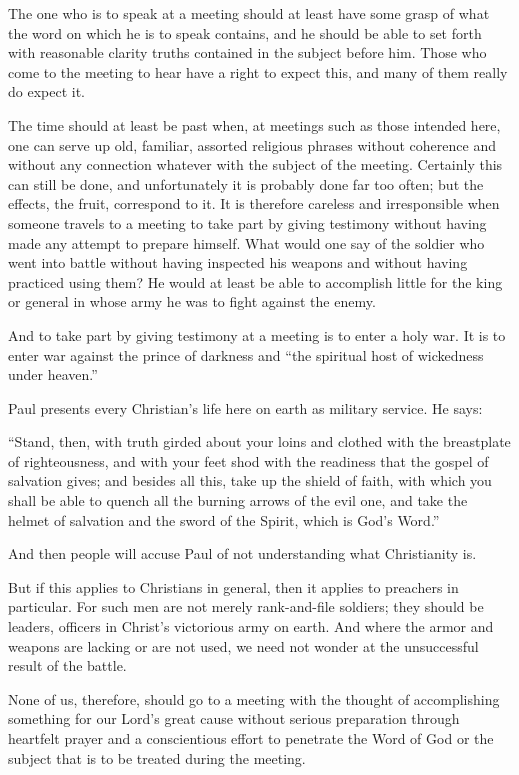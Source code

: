 The one who is to speak at a meeting should at least have some grasp of what the word on which he is to speak contains, and he should be able to set forth with reasonable clarity truths contained in the subject before him. Those who come to the meeting to hear have a right to expect this, and many of them really do expect it.

The time should at least be past when, at meetings such as those intended here, one can serve up old, familiar, assorted religious phrases without coherence and without any connection whatever with the subject of the meeting. Certainly this can still be done, and unfortunately it is probably done far too often; but the effects, the fruit, correspond to it. It is therefore careless and irresponsible when someone travels to a meeting to take part by giving testimony without having made any attempt to prepare himself. What would one say of the soldier who went into battle without having inspected his weapons and without having practiced using them? He would at least be able to accomplish little for the king or general in whose army he was to fight against the enemy.

And to take part by giving testimony at a meeting is to enter a holy war. It is to enter war against the prince of darkness and “the spiritual host of wickedness under heaven.”

Paul presents every Christian’s life here on earth as military service. He says:

“Stand, then, with truth girded about your loins and clothed with the breastplate of righteousness, and with your feet shod with the readiness that the gospel of salvation gives; and besides all this, take up the shield of faith, with which you shall be able to quench all the burning arrows of the evil one, and take the helmet of salvation and the sword of the Spirit, which is God’s Word.”

And then people will accuse Paul of not understanding what Christianity is.

But if this applies to Christians in general, then it applies to preachers in particular. For such men are not merely rank-and-file soldiers; they should be leaders, officers in Christ’s victorious army on earth. And where the armor and weapons are lacking or are not used, we need not wonder at the unsuccessful result of the battle.

None of us, therefore, should go to a meeting with the thought of accomplishing something for our Lord’s great cause without serious preparation through heartfelt prayer and a conscientious effort to penetrate the Word of God or the subject that is to be treated during the meeting.
